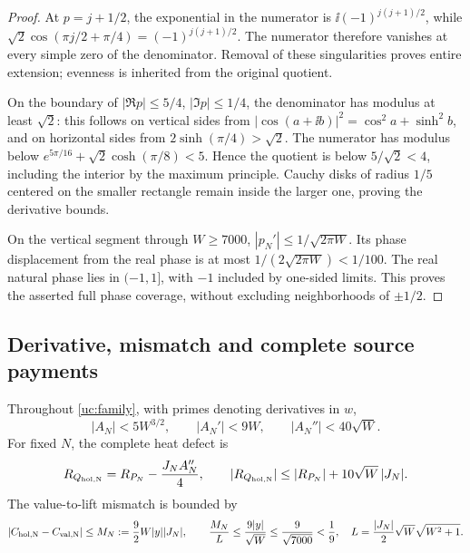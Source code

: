 \begin{proof}
At $p=j+1/2$, the exponential in the numerator is
$\ii(-1)^{j(j+1)/2}$, while
$\sqrt2\cos(\pi j/2+\pi/4)=(-1)^{j(j+1)/2}$.
The numerator therefore vanishes at every simple zero of the
denominator. Removal of these singularities proves entire extension;
evenness is inherited from the original quotient.

On the boundary of $|\Re p|\le5/4$, $|\Im p|\le1/4$, the denominator
has modulus at least $\sqrt2$: this follows on vertical sides from
$|\cos(a+\ii b)|^2=\cos^2a+\sinh^2b$, and on horizontal sides from
$2\sinh(\pi/4)>\sqrt2$. The numerator has modulus below
$e^{5\pi/16}+\sqrt2\cosh(\pi/8)<5$. Hence the quotient is below
$5/\sqrt2<4$, including the interior by the maximum principle.
Cauchy disks of radius $1/5$ centered on the smaller rectangle remain
inside the larger one, proving the derivative bounds.

On the vertical segment through $W\ge7000$,
$|p_N'|\le1/\sqrt{2\pi W}$. Its phase displacement from the real
phase is at most $1/(2\sqrt{2\pi W})<1/100$.
The real natural phase lies in $(-1,1]$, with $-1$ included by
one-sided limits. This proves the asserted full phase coverage, without
excluding neighborhoods of $\pm1/2$.
\end{proof}

\subsection{Derivative, mismatch and complete source payments}

\begin{proposition}
Throughout \eqref{uc:family}, with primes denoting derivatives in $w$,
\begin{equation}
 |A_N|<5W^{3/2},\qquad |A_N'|<9W,\qquad
 |A_N''|<40\sqrt W.
 \label{uc:A-bounds}
\end{equation}
For fixed $N$, the complete heat defect is
\begin{equation}
 R_{Q_{\rm hol,N}}=R_{P_N}-\frac{J_N A_N''}{4},\qquad
 |R_{Q_{\rm hol,N}}|\le |R_{P_N}|+10\sqrt W\,|J_N|.
 \label{uc:defect}
\end{equation}
The value-to-lift mismatch is bounded by
\begin{equation}
 |C_{\rm hol,N}-C_{\rm val,N}|\le M_N
 :=\frac92 W|y||J_N|,\qquad
 \frac{M_N}{L}\le\frac{9|y|}{\sqrt W}\le\frac9{\sqrt{7000}}<\frac19,
 \quad L=\frac{|J_N|}{2}\sqrt W\sqrt{W^2+1}.
 \label{uc:mismatch}
\end{equation}
\end{proposition}

